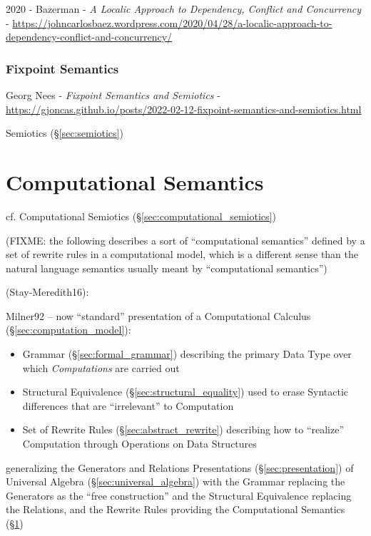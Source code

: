 2020 - Bazerman - \emph{A Localic Approach to Dependency, Conflict and
  Concurrency} -
\url{https://johncarlosbaez.wordpress.com/2020/04/28/a-localic-approach-to-dependency-conflict-and-concurrency/}



\subsubsection{Fixpoint Semantics}\label{sec:fixpoint_semantics}

Georg Nees - \emph{Fixpoint Semantics and Semiotics} -
\url{https://gjoncas.github.io/posts/2022-02-12-fixpoint-semantics-and-semiotics.html}

Semiotics (\S\ref{sec:semiotics})



\section{Computational Semantics}\label{sec:computational_semantics}

cf. Computational Semiotics (\S\ref{sec:computational_semiotics})

(FIXME: the following describes a sort of ``computational semantics'' defined by
a set of rewrite rules in a computational model, which is a different sense than
the natural language semantics usually meant by ``computational semantics'')

(Stay-Meredith16):

Milner92 \cite{milner92} -- now ``standard'' presentation of a Computational
Calculus (\S\ref{sec:computation_model}):
\begin{itemize}
  \item Grammar (\S\ref{sec:formal_grammar}) describing the primary Data Type
    over which \emph{Computations} are carried out
  \item Structural Equivalence (\S\ref{sec:structural_equality}) used to erase
    Syntactic differences that are ``irrelevant'' to Computation
  \item Set of Rewrite Rules (\S\ref{sec:abstract_rewrite}) describing how to
    ``realize'' Computation through Operations on Data Structures
\end{itemize}
generalizing the Generators and Relations Presentations
(\S\ref{sec:presentation}) of Universal Algebra (\S\ref{sec:universal_algebra})
with the Grammar replacing the Generators as the ``free construction'' and the
Structural Equivalence replacing the Relations, and the Rewrite Rules providing
the Computational Semantics (\S\ref{sec:computational_semantics})



